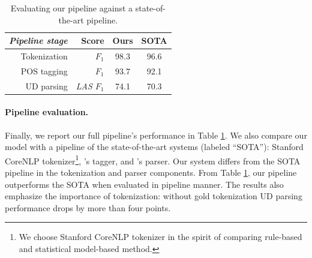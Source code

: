 \documentclass[11pt,a4paper]{article}
\newcommand{\yjcomment}[1]{\textcolor{orange}{[$_\mathrm{L}^\mathrm{Y}$#1]}}
\newcommand{\nascomment}[1]{\textcolor{blue}{[#1 ---\textsc{nas}]}}
\newcommand{\yicomment}[1]{\textcolor{gray}{[#1 ---\textsc{yi}]}}
\begin{document}

\begin{table}[t]
	\centering
	\begin{tabular}{rrcc}
		\hline
		\it Pipeline stage & Score & Ours & SOTA \\
		\hline
		Tokenization  & \it $F_1$ & 98.3 & 96.6 \\		
		POS tagging &  \it  $F_1$ & 93.7 & 92.1 \\
		UD parsing & \it LAS $F_1$ & 74.1 & 70.3 \\
		\hline
	\end{tabular}
	\caption{Evaluating our pipeline against a state-of-the-art pipeline. \label{tbl:pipline} %
	}
\end{table}

\paragraph{Pipeline evaluation.} Finally, we report  our full
pipeline's performance in  Table \ref{tbl:pipline}. We also compare
our model with a pipeline of the state-of-the-art systems (labeled  ``SOTA''):
Stanford CoreNLP tokenizer\footnote{We choose Stanford CoreNLP tokenizer in the spirit of comparing rule-based and statistical model-based method.}, %
\citet{owoputi-EtAl:2013:NAACL-HLT}'s tagger, and \citet{dozat-qi-manning:2017:K17-3}'s parser.
Our system differs from the SOTA pipeline in the tokenization and parser components.
From Table \ref{tbl:pipline}, our pipeline outperforms the SOTA when
evaluated in pipeline manner.
The results also emphasize the
importance of tokenization:  without gold tokenization
UD parsing
performance drops by more than four points.
\end{document}
